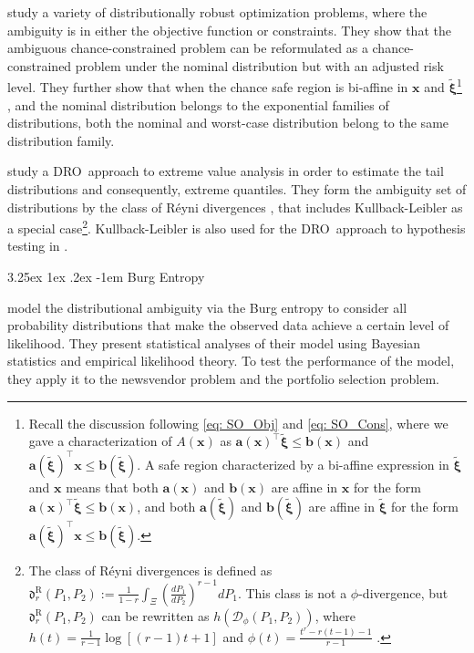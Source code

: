 \documentclass[final,onefignum,onetabnum]{class}
\makeatletter
\renewcommand\subparagraph{\@startsection{subparagraph}{5}{\parindent}%
  {3.25ex \@plus1ex \@minus .2ex}%
  {-1em}%
  {\normalfont\normalsize\bfseries}}
\newcommand{\bs}[1]{\boldsymbol{#1}} %
\newcommand{\Cs}[1]{\mathcal{#1}} %
\newcommand{\Fs}[1]{\mathfrak{#1}} %
\newcommand{\txi}{\tilde{\bs{\xi}}}
\newcommand{\dro}{DRO}
\makeatother
\begin{document}
\citet{hu2012kullback} study a variety of distributionally robust optimization problems, where the ambiguity is in either the objective function or constraints. They  show that the ambiguous chance-constrained problem can be reformulated as a chance-constrained problem under the nominal distribution but with an adjusted risk level. They further show that when the chance safe region is bi-affine in $\bs{x}$ and $\txi$\footnote{Recall the discussion following \eqref{eq: SO_Obj} and \eqref{eq: SO_Cons}, where we gave a characterization of $A(\bs{x})$ as $\bs{a}(\bs{x})^{\top}\txi \le \bs{b}(\bs{x})$ and $\bs{a}(\txi)^{\top} \bs{x} \le \bs{b}(\txi)$. A safe region characterized by a bi-affine expression in $\txi$ and  $\bs{x}$ means that  both $\bs{a}(\bs{x})$ and $\bs{b}(\bs{x})$ are affine in $\bs{x}$ for the form $\bs{a}(\bs{x})^{\top}\txi \le \bs{b}(\bs{x})$, and both $\bs{a}(\txi)$ and $\bs{b}(\txi)$ are affine in $\txi$ for the form $\bs{a}(\txi)^{\top}\bs{x} \le \bs{b}(\txi)$.}
, and the nominal distribution belongs to the exponential families of distributions, both the nominal and worst-case distribution belong to the same distribution family.  



\citet{blanchet2018structural} study a \dro\ approach to extreme value analysis in order to estimate the tail distributions and consequently, extreme quantiles. They form the ambiguity set of distributions by the class of R\'{e}yni divergences  \citep{pardo2005}, that includes  Kullback-Leibler as a special case\footnote{The class of R\'{e}yni divergences is defined as  $\Fs{d}^{\text{R}}_{r}(P_{1}, P_{2}):=\frac{1}{1-r}\int_{\Xi}\left(\frac{d P_{1}}{d P_{2}}\right)^{r-1} d P_{1}$. This class is not a  $\phi$-divergence, but $\Fs{d}^{\text{R}}_{r}(P_{1}, P_{2})$ can be rewritten as $h(\Cs{D}_{\phi}(P_{1}, P_{2}))$, where $h(t)=\frac{1}{r-1}\log [(r-1)t +1] $ and $\phi(t)=\frac{t^{r}-r(t-1)-1}{r-1}$ \citep{pardo2005}.}.
Kullback-Leibler is also used for the \dro\ approach to hypothesis testing in \citet{levy2009,gul2017,gul2017asymptotically}. 



\subparagraph{Burg Entropy} 

\citet{wang2016} model the distributional ambiguity via the Burg entropy to consider all probability distributions that make the observed data achieve a certain level of likelihood. They present statistical analyses of their model using Bayesian statistics and empirical likelihood theory. To test the
performance of the model, they apply it to the newsvendor problem and the portfolio selection problem. 
\end{document}
